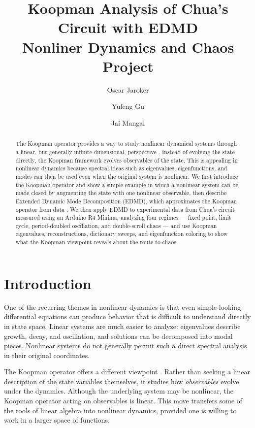 \documentclass[11pt]{article}
\title{Koopman Analysis of Chua's Circuit with EDMD \\ \vspace{0.2cm}
\large Nonliner Dynamics and Chaos Project}
\author{Oscar Jaroker \and Yufeng Gu \and Jai Mangal}
\date{}
\begin{document}
\maketitle

\begin{abstract}
The Koopman operator provides a way to study nonlinear dynamical systems through a linear, but generally infinite-dimensional, perspective \citep{koopman1931}. Instead of evolving the state directly, the Koopman framework evolves observables of the state. This is appealing in nonlinear dynamics because spectral ideas such as eigenvalues, eigenfunctions, and modes can then be used even when the original system is nonlinear. We first introduce the Koopman operator and show a simple example in which a nonlinear system can be made closed by augmenting the state with one nonlinear observable, then describe Extended Dynamic Mode Decomposition (EDMD), which approximates the Koopman operator from data \citep{williams2015}. We then apply EDMD to experimental data from Chua's circuit measured using an Arduino R4 Minima, analyzing four regimes --- fixed point, limit cycle, period-doubled oscillation, and double-scroll chaos --- and use Koopman eigenvalues, reconstructions, dictionary sweeps, and eigenfunction coloring to show what the Koopman viewpoint reveals about the route to chaos.
\end{abstract}

\section{Introduction}
One of the recurring themes in nonlinear dynamics is that even simple-looking differential equations can produce behavior that is difficult to understand directly in state space. Linear systems are much easier to analyze: eigenvalues describe growth, decay, and oscillation, and solutions can be decomposed into modal pieces. Nonlinear systems do not generally permit such a direct spectral analysis in their original coordinates.

The Koopman operator offers a different viewpoint \citep{koopman1931}. Rather than seeking a linear description of the state variables themselves, it studies how \emph{observables} evolve under the dynamics. Although the underlying system may be nonlinear, the Koopman operator acting on observables is linear. This move transfers some of the tools of linear algebra into nonlinear dynamics, provided one is willing to work in a larger space of functions.
\end{document}

